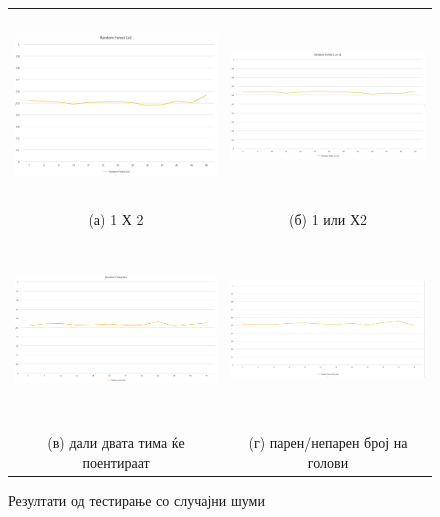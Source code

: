 \begin{figure}[H]
\centering
\begin{tabular}{cc}
  \includegraphics[width=8cm,height=5cm]{images/rf_1x2.png} &   
  \includegraphics[width=8cm,height=5cm]{images/rf_1_or_x2.png} \\
(а) 1 Х 2 & (б) 1 или Х2 \\
 \includegraphics[width=8cm,height=5cm]{images/rf_bts.png}
 &   
 \includegraphics[width=8cm,height=5cm]{images/rf_odd_even.png} \\
(в) дали двата тима ќе поентираат & (г) парен/непарен број на голови \\
\end{tabular}
\caption{Резултати од тестирање со случајни шуми}
\label{fig:random_forest}
\end{figure}

